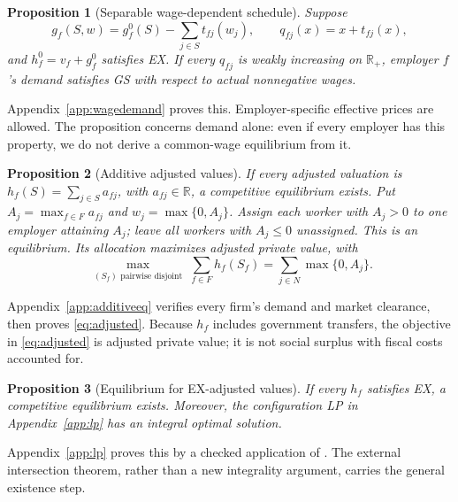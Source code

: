 \documentclass[11pt]{article}
\newtheorem{proposition}{Proposition}
\theoremstyle{definition}
\theoremstyle{remark}
\numberwithin{equation}{section}
\begin{document}
\begin{proposition}[Separable wage-dependent schedule]\label{prop:wagedemand}
Suppose
\begin{equation}
g_f(S,w)=g_f^0(S)-\sum_{j\in S}t_{fj}(w_j),\qquad
q_{fj}(x)=x+t_{fj}(x),                          \label{eq:effective}
\end{equation}
and $h_f^0=v_f+g_f^0$ satisfies EX. If every $q_{fj}$ is weakly increasing on $\mathbb R_+$, employer $f$'s demand satisfies GS with respect to actual nonnegative wages.
\end{proposition}
\noindent Appendix~\ref{app:wagedemand} proves this. Employer-specific effective prices are allowed. The proposition concerns demand alone: even if every employer has this property, we do not derive a common-wage equilibrium from it.

\begin{proposition}[Additive adjusted values]\label{prop:additiveeq}
If every adjusted valuation is $h_f(S)=\sum_{j\in S}a_{fj}$, with $a_{fj}\in\mathbb R$, a competitive equilibrium exists. Put $A_j=\max_{f\in F}a_{fj}$ and $w_j=\max\{0,A_j\}$. Assign each worker with $A_j>0$ to one employer attaining $A_j$; leave all workers with $A_j\le0$ unassigned. This is an equilibrium. Its allocation maximizes adjusted private value, with
\begin{equation}
\max_{\substack{(S_f)\text{ pairwise disjoint}}}
\sum_{f\in F}h_f(S_f)
=\sum_{j\in N}\max\{0,A_j\}.                  \label{eq:adjusted}
\end{equation}
\end{proposition}
\noindent Appendix~\ref{app:additiveeq} verifies every firm's demand and market clearance, then proves \eqref{eq:adjusted}. Because $h_f$ includes government transfers, the objective in \eqref{eq:adjusted} is adjusted private value; it is not social surplus with fiscal costs accounted for.

\begin{proposition}[Equilibrium for EX-adjusted values]\label{prop:generaleq}
If every $h_f$ satisfies EX, a competitive equilibrium exists. Moreover, the configuration LP in Appendix~\ref{app:lp} has an integral optimal solution.
\end{proposition}
\noindent Appendix~\ref{app:lp} proves this by a checked application of \citet[Theorems 6.1(9) and 9.4]{Murota2022}. The external intersection theorem, rather than a new integrality argument, carries the general existence step.
\end{document}
